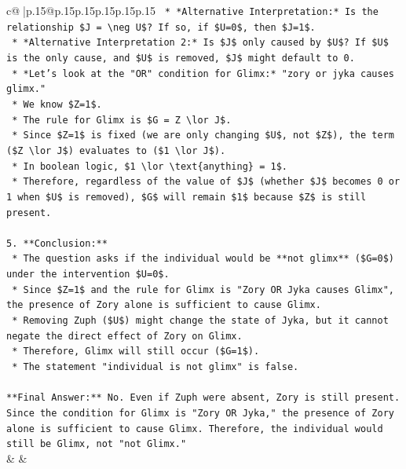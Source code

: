 \documentclass{article}
\begin{document}
{\begin{supertabular}{c@{$\;$}|p{.15\linewidth}@{}p{.15\linewidth}p{.15\linewidth}p{.15\linewidth}p{.15\linewidth}p{.15\linewidth}}
{{{\texttt{            *   *Alternative Interpretation:* Is the relationship \$J = \textbackslash{}neg U\$? If so, if \$U=0\$, then \$J=1\$.} \\
\texttt{            *   *Alternative Interpretation 2:* Is \$J\$ only caused by \$U\$? If \$U\$ is the only cause, and \$U\$ is removed, \$J\$ might default to 0.} \\
\texttt{            *   *Let's look at the "OR" condition for Glimx:* "zory or jyka causes glimx."} \\
\texttt{            *   We know \$Z=1\$.} \\
\texttt{            *   The rule for Glimx is \$G = Z \textbackslash{}lor J\$.} \\
\texttt{            *   Since \$Z=1\$ is fixed (we are only changing \$U\$, not \$Z\$), the term (\$Z \textbackslash{}lor J\$) evaluates to (\$1 \textbackslash{}lor J\$).} \\
\texttt{            *   In boolean logic, \$1 \textbackslash{}lor \textbackslash{}text\{anything\} = 1\$.} \\
\texttt{            *   Therefore, regardless of the value of \$J\$ (whether \$J\$ becomes 0 or 1 when \$U\$ is removed), \$G\$ will remain \$1\$ because \$Z\$ is still present.} \\
\\ 
\texttt{5.  **Conclusion:**} \\
\texttt{    *   The question asks if the individual would be **not glimx** (\$G=0\$) under the intervention \$U=0\$.} \\
\texttt{    *   Since \$Z=1\$ and the rule for Glimx is "Zory OR Jyka causes Glimx", the presence of Zory alone is sufficient to cause Glimx.} \\
\texttt{    *   Removing Zuph (\$U\$) might change the state of Jyka, but it cannot negate the direct effect of Zory on Glimx.} \\
\texttt{    *   Therefore, Glimx will still occur (\$G=1\$).} \\
\texttt{    *   The statement "individual is not glimx" is false.} \\
\\ 
\texttt{**Final Answer:** No. Even if Zuph were absent, Zory is still present. Since the condition for Glimx is "Zory OR Jyka," the presence of Zory alone is sufficient to cause Glimx. Therefore, the individual would still be Glimx, not "not Glimx."} \\
            }
        }
    }
    & & \\ \\


\end{supertabular}}
\end{document}
